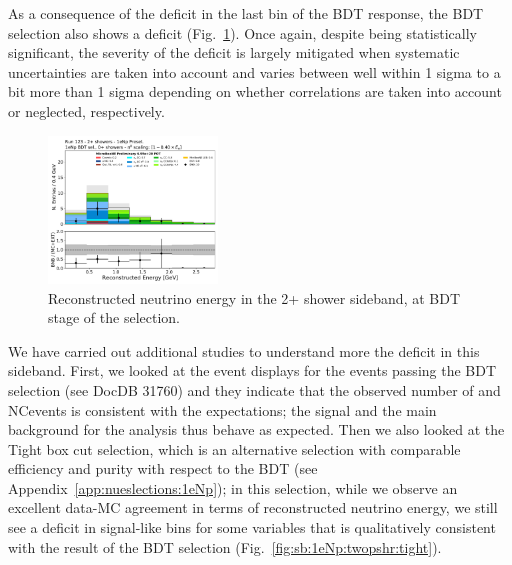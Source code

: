 As a consequence of the deficit in the last bin of the BDT response, the BDT selection also shows a deficit (Fig.~\ref{fig:sb:1eNp:twopshr:bdt:recoe}). Once again, despite being statistically significant, the severity of the deficit is largely mitigated when systematic uncertainties are taken into account and varies between well within 1 sigma to a bit more than 1 sigma depending on whether correlations are taken into account or neglected, respectively. 

\begin{figure}[H]
    \begin{center}
    \includegraphics[width=0.4\textwidth]{Sidebands/Figures/1eNp/TwoShower/TwoPShr_NP_NPBDTAllShr_pi0e040/reco_e_coarse.pdf}
    \caption{\label{fig:sb:1eNp:twopshr:bdt:recoe} Reconstructed neutrino energy in the 2+ shower sideband, at BDT stage of the \npsel selection.}
    \end{center}
\end{figure}

We have carried out additional studies to understand more the deficit in this sideband. First, we looked at the event displays for the events passing the BDT selection (see DocDB 31760) and they indicate that the observed number of \npsel and NC\pizero events is consistent with the expectations; the signal and the main background for the analysis thus behave as expected. Then we also looked at the Tight box cut selection, which is an alternative selection with comparable efficiency and purity with respect to the BDT (see Appendix~\ref{app:nueslections:1eNp}); in this selection, while we observe an excellent data-MC agreement in terms of reconstructed neutrino energy, we still see a deficit in signal-like bins for some variables that is qualitatively consistent with the result of the BDT selection (Fig.~\ref{fig:sb:1eNp:twopshr:tight}).


